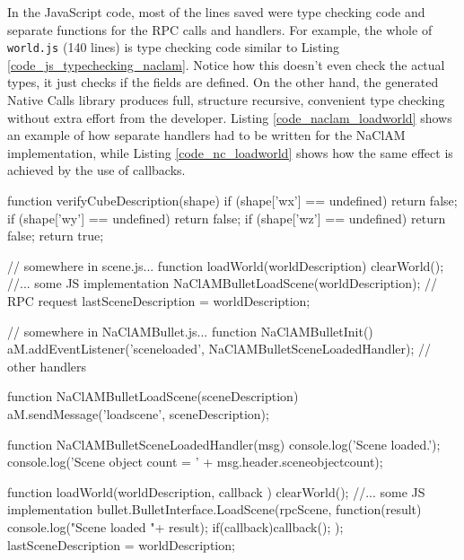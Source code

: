 In the JavaScript code, most of the lines saved were type checking code and separate functions for the RPC calls and handlers. For example, the whole of \lstinline{world.js} (140 lines) is type checking code similar to Listing \ref{code_js_typechecking_naclam}. Notice how this doesn't even check the actual types, it just checks if the fields are defined. On the other hand, the generated Native Calls library produces full, structure recursive, convenient type checking without extra effort from the developer. Listing \ref{code_naclam_loadworld} shows an example of how separate handlers had to be written for the NaClAM implementation, while Listing \ref{code_nc_loadworld} shows how the same effect is achieved by the use of callbacks.

\begin{code}
function verifyCubeDescription(shape) {
  if (shape['wx'] == undefined) {
    return false;
  }
  if (shape['wy'] == undefined) {
    return false;
  }
  if (shape['wz'] == undefined) {
    return false;
  }
  return true;
}
\end{code}

\begin{code}
// somewhere in scene.js... 
function loadWorld(worldDescription) {
  clearWorld();
  //... some JS implementation
  NaClAMBulletLoadScene(worldDescription); // RPC request
  lastSceneDescription = worldDescription;
}

// somewhere in NaClAMBullet.js...
function NaClAMBulletInit() {
  aM.addEventListener('sceneloaded', NaClAMBulletSceneLoadedHandler);
  // other handlers
}

function NaClAMBulletLoadScene(sceneDescription) {
  aM.sendMessage('loadscene', sceneDescription);
}

function NaClAMBulletSceneLoadedHandler(msg) {
  console.log('Scene loaded.');
  console.log('Scene object count = ' + msg.header.sceneobjectcount);
}
\end{code}

\begin{code}
function loadWorld(worldDescription, callback ) {
  clearWorld();
  //... some JS implementation
  bullet.BulletInterface.LoadScene(rpcScene, function(result){
    console.log("Scene loaded "+ result);
    if(callback)callback();
  });
  lastSceneDescription = worldDescription;
}
\end{code}

